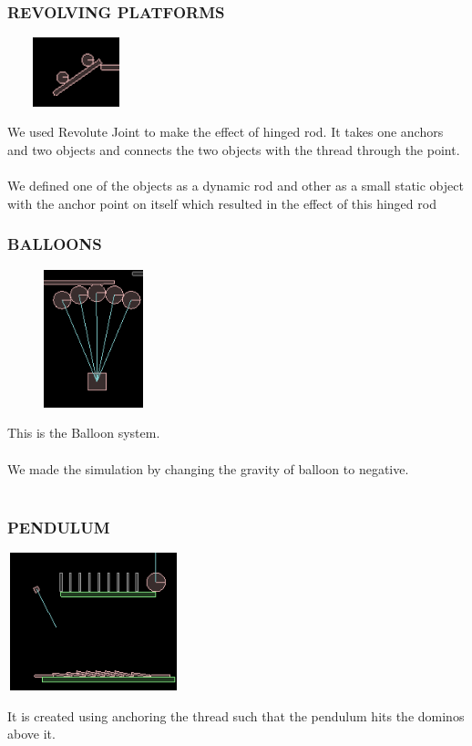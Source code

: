 \documentclass[t,compress,11pt,xcolor=dvipsnames]{beamer}
\begin{document}
\begin{frame}
\frametitle{REVOLVING PLATFORMS}
\begin{center}
\includegraphics[width=4cm,height=2cm]{hinge}
\end{center}
We used Revolute Joint to make the effect of hinged rod.
It takes one anchors and two objects and connects the two objects with
the thread through the point.\\~\\
We defined one of the objects as a dynamic rod and other as a small
static object with the anchor point on itself which resulted in the effect
of this hinged rod
\end{frame}
\begin{frame}
\frametitle{BALLOONS}
\begin{center}
\includegraphics[width=5cm,height=4cm]{balloon}
\end{center}
This is the Balloon system.\\~\\
We made the simulation by changing the gravity of balloon to negative.\\~\\
\end{frame}
\begin{frame}
\frametitle{PENDULUM}
\begin{center}
\includegraphics[width=5cm,height=4cm]{pendulum}
\end{center}
It is created using anchoring the thread such that the pendulum hits the dominos above it.
\end{frame}
\end{document}
